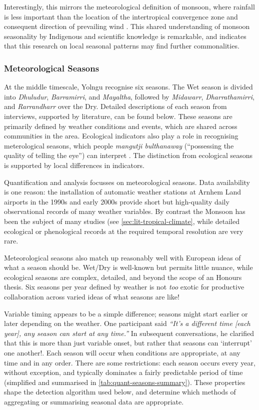 Interestingly, this mirrors the meteorological definition of monsoon,
where rainfall is less important than the location of the intertropical
convergence zone and consequent direction of prevailing wind \citep[eg.][]{holland1985,cook2001}.
This shared understanding of monsoon seasonality by Indigenous and scientific
knowledge is remarkable, and indicates that this research on local seasonal
patterns may find further commonalities.


\subsubsection{Meteorological Seasons}

At the middle timescale, Yolngu recognise six seasons.
The Wet season is divided into \textit{Dhuludur}, \textit{Barramirri},
and \textit{Mayaltha}, followed by \textit{Midawarr}, \textit{Dharrathamirri},
and \textit{Rarrandharr} over the Dry.  Detailed descriptions of each
season from interviews, supported by literature, can be found below.
%
These seasons are primarily defined by weather conditions and events,
which are shared across communities in the area.  Ecological indicators
also play a role in recognising meterological seasons, which people
\textit{mangutji bulthanaway} (``possessing the quality of telling the eye'')
can interpret \citep[p35]{atlas2014}.  The distinction from ecological
seasons is supported by local differences in indicators.

Quantification and analysis focusses on meteorological seasons.
Data availability is one reason:  the installation of automatic weather
stations at Arnhem Land airports in the 1990s and early 2000s provide
short but high-quality daily observational records of many weather variables.
By contrast the Monsoon has been the subject of many studies (see \cref{sec:lit-tropical-climate}, while
detailed ecological or phenological records at the required temporal
resolution are very rare.

Meteorological seasons also match up reasonably well with European ideas
of what a season should be.  Wet/Dry is well-known but permits little nuance,
while ecological seasons are complex, detailed, and beyond the scope of an Honours
thesis.  Six seasons per year defined by weather is not \emph{too} exotic
for productive collaboration across varied ideas of what seasons are like!

Variable timing appears to be a simple difference; seasons might start
earlier or later depending on the weather.  One participant said
\textsl{``It's a different time [each year], any season can start at any time.''}
In subsequent conversations, he clarified that this is more than just
variable onset, but rather that seasons can `interrupt' one another!.  Each season will
occur when conditions are appropriate, at any time and in any order.
%
There are some restrictions: each season occurs every year,
without exception, and typically dominates a fairly predictable period
of time (simplified and summarised in \cref{tab:quant-seasons-summary}).
These properties shape the detection algorithm used below, and determine
which methods of aggregating or summarising seasonal data are appropriate.



